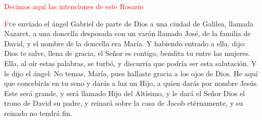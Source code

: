 \documentclass[10pt,twoside]{book}
\begin{document}
\begin{paracol}{2}
      \begin{leftcolumn*}
            
      \end{leftcolumn*}
      \begin{otherlanguage}{latin}
            \begin{rightcolumn}
                
            \end{rightcolumn}
      \end{otherlanguage}

      \begin{leftcolumn*}
            
      \end{leftcolumn*}
      \begin{otherlanguage}{latin}
            \begin{rightcolumn}
                
            \end{rightcolumn}
      \end{otherlanguage}
\end{paracol}

\vspace{0.5em}

\begin{center}
      \textcolor{red}{Decimos aquí las intenciones de este Rosario}
\end{center}

\vspace{0.5em}

\noindent{}

\vspace{1.5em}

\noindent{}
\lettrine[lines=2]{\textcolor{red}{F}}ue enviado el ángel Gabriel de parte de Dios a una ciudad de Galilea, llamada Nazaret, 
a una doncella desposada con un varón llamado José, de la familia de David, y el nombre de la doncella era María. 
Y habiendo entrado a ella, dijo: Dios te salve, llena de gracia, el Señor es contigo, bendita tu entre las mujeres.
Ella, al oír estas palabras, se turbó, y discurría que podría ser esta salutación. Y le dijo el ángel: No temas, María, 
pues hallaste gracia a los ojos de Dios. He aquí que concebirás en tu seno y darás a luz un Hijo, a quien darás por nombre Jesús. 
Este será grande, y será llamado Hijo del Altísimo, y le dará el Señor Dios el trono de David su padre, y reinará sobre la 
casa de Jacob etérnamente, y su reinado no tendrá fin.
\end{document}
